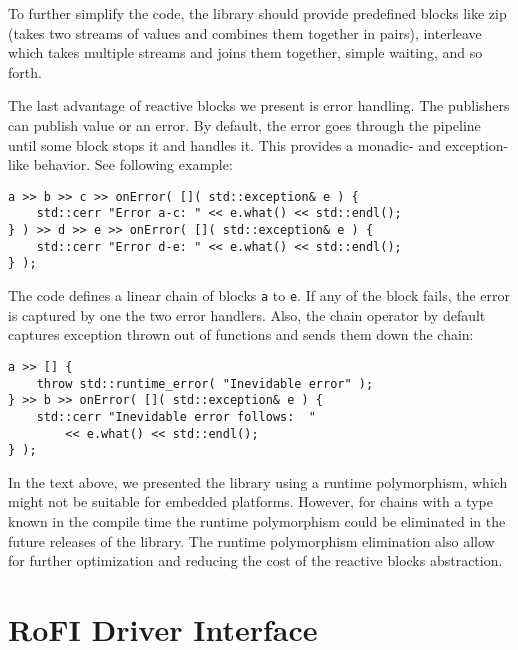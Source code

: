 To further simplify the code, the library should provide predefined blocks like
zip (takes two streams of values and combines them together in pairs),
interleave which takes multiple streams and joins them together, simple waiting,
and so forth.

The last advantage of reactive blocks we present is error handling. The
publishers can publish value or an error. By default, the error goes through the
pipeline until some block stops it and handles it. This provides a monadic- and
exception-like behavior. See following example:
\begin{verbatim}
a >> b >> c >> onError( []( std::exception& e ) {
    std::cerr "Error a-c: " << e.what() << std::endl();
} ) >> d >> e >> onError( []( std::exception& e ) {
    std::cerr "Error d-e: " << e.what() << std::endl();
} );
\end{verbatim}
The code defines a linear chain of blocks \texttt{a} to \texttt{e}. If any of
the block fails, the error is captured by one the two error handlers. Also, the
chain operator by default captures exception thrown out of functions and sends
them down the chain:
\begin{verbatim}
a >> [] {
    throw std::runtime_error( "Inevidable error" );
} >> b >> onError( []( std::exception& e ) {
    std::cerr "Inevidable error follows:  "
        << e.what() << std::endl();
} );
\end{verbatim}

In the text above, we presented the library using a runtime polymorphism, which
might not be suitable for embedded platforms. However, for chains with a type
known in the compile time the runtime polymorphism could be eliminated in the
future releases of the library. The runtime polymorphism elimination also allow
for further optimization and reducing the cost of the reactive blocks
abstraction.

\section{RoFI Driver Interface}
